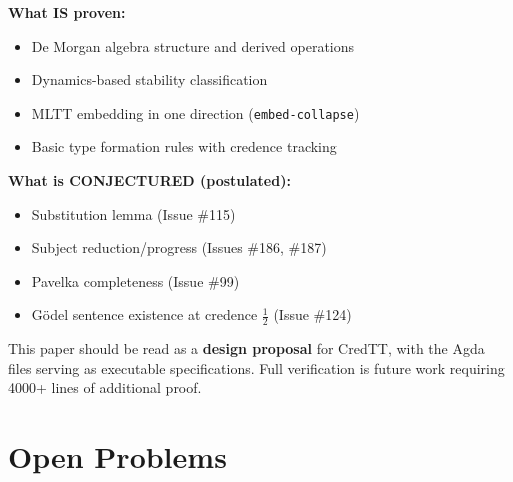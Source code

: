\documentclass[11pt,a4paper]{article}
\begin{document}
\noindent\textbf{What IS proven:}
\begin{itemize}
    \item De Morgan algebra structure and derived operations
    \item Dynamics-based stability classification
    \item MLTT embedding in one direction (\texttt{embed-collapse})
    \item Basic type formation rules with credence tracking
\end{itemize}

\noindent\textbf{What is CONJECTURED (postulated):}
\begin{itemize}
    \item Substitution lemma (Issue \#115)
    \item Subject reduction/progress (Issues \#186, \#187)
    \item Pavelka completeness (Issue \#99)
    \item G\"odel sentence existence at credence $\frac{1}{2}$ (Issue \#124)
\end{itemize}

This paper should be read as a \textbf{design proposal} for CredTT, with the Agda files serving as executable specifications. Full verification is future work requiring 4000+ lines of additional proof.

\section{Open Problems}
\end{document}
